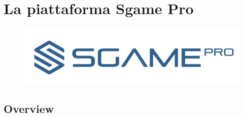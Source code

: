 \documentclass[11pt]{thesistemp}
\begin{document}

\section{La piattaforma Sgame Pro}
\begin{figure}[h]\hfill
    \centering
    \includegraphics[width=\textwidth]{sgamepro-logo.png}
    \label{fig:sgamepro}
\end{figure}

\subsection{Overview}
\end{document}
